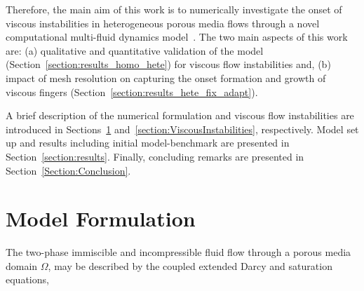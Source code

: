 \documentclass[preprint,authoryear,12pt]{elsarticle}
\newcommand{\PN}[2][error]{P$_{#1}$DG-P$_{#2}$}
\begin{document}
Therefore, the main aim of this work is to numerically investigate the onset of viscous instabilities in heterogeneous porous media flows through a novel computational multi-fluid dynamics model~\citep{gomes_2017}. The two main aspects of this work are: (a) qualitative and quantitative validation of the model (Section~\ref{section:results_homo_hete}) for viscous flow instabilities and, (b) impact of mesh resolution on capturing the onset formation and growth of viscous fingers (Section~\ref{section:results_hete_fix_adapt}).

 
\medskip
A brief description of the numerical formulation and viscous flow instabilities are introduced in Sections~\ref{equations_scheme} and~\ref{section:ViscousInstabilities}, respectively. Model set up and results including initial model-benchmark are presented in Section~\ref{section:results}. Finally, concluding remarks are presented in Section~\ref{Section:Conclusion}.

\section{Model Formulation}\label{equations_scheme}      

The two-phase immiscible and incompressible fluid flow through a porous media domain $\Omega$, may be described by the coupled extended Darcy and saturation equations,
\end{document}
